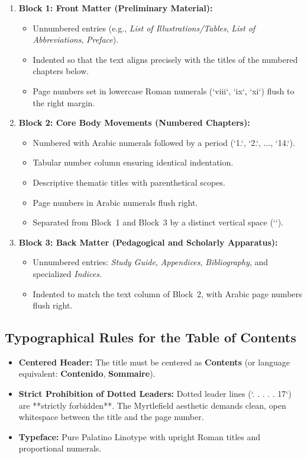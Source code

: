 \documentclass[11pt,letterpaper]{article}
\begin{document}
\begin{enumerate}
  \item \textbf{Block 1: Front Matter (Preliminary Material):}
  \begin{itemize}
    \item Unnumbered entries (e.g., \emph{List of Illustrations/Tables}, \emph{List of Abbreviations}, \emph{Preface}).
    \item Indented so that the text aligns precisely with the titles of the numbered chapters below.
    \item Page numbers set in lowercase Roman numerals (`viii`, `ix`, `xi`) flush to the right margin.
  \end{itemize}

  \item \textbf{Block 2: Core Body Movements (Numbered Chapters):}
  \begin{itemize}
    \item Numbered with Arabic numerals followed by a period (`1.`, `2.`, ..., `14.`).
    \item Tabular number column ensuring identical indentation.
    \item Descriptive thematic titles with parenthetical scopes.
    \item Page numbers in Arabic numerals flush right.
    \item Separated from Block~1 and Block~3 by a distinct vertical space (`\vspace{1.1em}`).
  \end{itemize}

  \item \textbf{Block 3: Back Matter (Pedagogical and Scholarly Apparatus):}
  \begin{itemize}
    \item Unnumbered entries: \emph{Study Guide}, \emph{Appendices}, \emph{Bibliography}, and specialized \emph{Indices}.
    \item Indented to match the text column of Block~2, with Arabic page numbers flush right.
  \end{itemize}
\end{enumerate}

\subsection{Typographical Rules for the Table of Contents}
\begin{itemize}
  \item \textbf{Centered Header:} The title must be centered as \textbf{\Large Contents} (or language equivalent: \textbf{\Large Contenido}, \textbf{\Large Sommaire}).
  \item \textbf{Strict Prohibition of Dotted Leaders:} Dotted leader lines (`. . . . . 17`) are **strictly forbidden**. The Myrtlefield aesthetic demands clean, open whitespace between the title and the page number.
  \item \textbf{Typeface:} Pure Palatino Linotype with upright Roman titles and proportional numerals.
\end{itemize}
\end{document}
